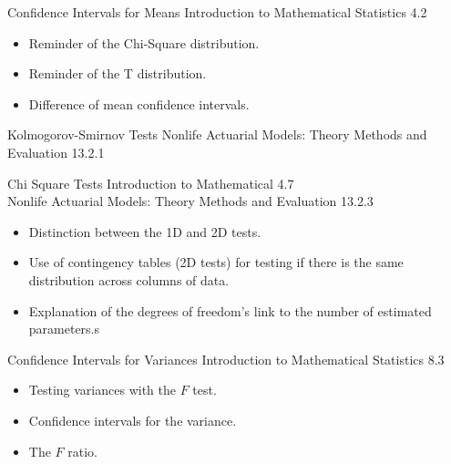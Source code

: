 \begin{CHPT_SUMM_AUTO_NUMB}[label = {L.-35}]{Confidence Intervals for Means}
Introduction to Mathematical Statistics 4.2

\tcbline

\begin{itemize}
	\item	Reminder of the Chi-Square distribution.
	\item	Reminder of the T distribution.
	\item	Difference of mean confidence intervals.
\end{itemize}
\end{CHPT_SUMM_AUTO_NUMB}

\begin{CHPT_SUMM_AUTO_NUMB}[label = {L.-36}]{Kolmogorov-Smirnov Tests}
Nonlife Actuarial Models: Theory Methods and Evaluation 13.2.1

\tcbline


\end{CHPT_SUMM_AUTO_NUMB}

\begin{CHPT_SUMM_AUTO_NUMB}[label = {L.-37}]{Chi Square Tests}
Introduction to Mathematical 4.7	\\
Nonlife Actuarial Models: Theory Methods and Evaluation 13.2.3

\tcbline

\begin{itemize}
	\item	Distinction between the 1D and 2D tests.
	\item	Use of contingency tables (2D tests) for testing if there is the same distribution across columns of data.
	\item	Explanation of the degrees of freedom's link to the number of estimated parameters.s
\end{itemize}
\end{CHPT_SUMM_AUTO_NUMB}

\begin{CHPT_SUMM_AUTO_NUMB}[label = {L.-38}]{Confidence Intervals for Variances}
Introduction to Mathematical Statistics 8.3

\tcbline

\begin{itemize}
	\item	Testing variances with the $F$ test.
	\item	Confidence intervals for the variance.
	\item	The $F$ ratio.
\end{itemize}
\end{CHPT_SUMM_AUTO_NUMB}

